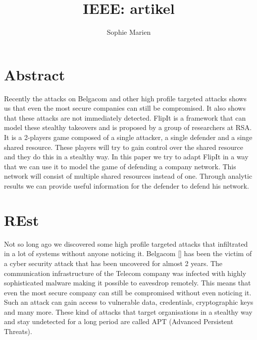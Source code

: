 \documentclass[a4paper, 11pt]{article}
\begin{document}
\begin{titlepage}
\title{IEEE: artikel}
\author{Sophie Marien}
\date{} 
\end{titlepage}



\maketitle
\section*{Abstract}
Recently the attacks on Belgacom and other high profile targeted attacks shows us that even the most secure companies can still be compromised. It also shows that these attacks are not immediately detected. FlipIt is a framework that can model these stealthy takeovers and is proposed by a group of researchers at RSA. It is a 2-players game composed of a single attacker, a single defender and a singe shared resource. These players will try to gain control over the shared resource and they do this in a stealthy way. In this paper we try to adapt FlipIt in a way that we can use it to model the game of defending a company network. This network will consist of multiple shared resources instead of one. Through analytic results we can provide useful information for the defender to defend his network.


\section{REst}
 
 Not so long ago we discovered some high profile targeted attacks that infiltrated in a lot of systems without anyone noticing it. Belgacom [] has been the victim of a cyber security attack that has been uncovered for almost 2 years. The communication infrastructure of the Telecom company was infected with highly sophisticated malware making it possible to eavesdrop remotely. This means that even the most secure company can still be compromised without even noticing it. Such an attack can gain access to vulnerable data, credentials, cryptographic keys and many more. These kind of attacks that target organisations in a stealthy way and stay undetected for a long period are called APT (Advanced Persistent Threats). 
 
\end{document}
